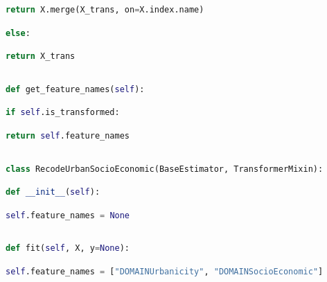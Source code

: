 \documentclass[
  11pt,
  a4paper,
  DIV=12,captions=tableheading,oneside]{scrbook}
\begin{document}
\begin{lstlisting}[language=Python,stepnumber=2,basicstyle=\footnotesize]
            return X.merge(X_trans, on=X.index.name)\end{lstlisting}
\begin{lstlisting}[language=Python,stepnumber=2,basicstyle=\footnotesize]
        else:\end{lstlisting}
\begin{lstlisting}[language=Python,stepnumber=2,basicstyle=\footnotesize]
            return X_trans\end{lstlisting}
\begin{lstlisting}[language=Python,stepnumber=2,basicstyle=\footnotesize]
\end{lstlisting}
\begin{lstlisting}[language=Python,stepnumber=2,basicstyle=\footnotesize]
    def get_feature_names(self):\end{lstlisting}
\begin{lstlisting}[language=Python,stepnumber=2,basicstyle=\footnotesize]
        if self.is_transformed:\end{lstlisting}
\begin{lstlisting}[language=Python,stepnumber=2,basicstyle=\footnotesize]
            return self.feature_names\end{lstlisting}
\begin{lstlisting}[language=Python,stepnumber=2,basicstyle=\footnotesize]
\end{lstlisting}
\begin{lstlisting}[language=Python,stepnumber=2,basicstyle=\footnotesize]
class RecodeUrbanSocioEconomic(BaseEstimator, TransformerMixin):\end{lstlisting}
\begin{lstlisting}[language=Python,stepnumber=2,basicstyle=\footnotesize]
    def __init__(self):\end{lstlisting}
\begin{lstlisting}[language=Python,stepnumber=2,basicstyle=\footnotesize]
        self.feature_names = None\end{lstlisting}
\begin{lstlisting}[language=Python,stepnumber=2,basicstyle=\footnotesize]
\end{lstlisting}
\begin{lstlisting}[language=Python,stepnumber=2,basicstyle=\footnotesize]
    def fit(self, X, y=None):\end{lstlisting}
\begin{lstlisting}[language=Python,stepnumber=2,basicstyle=\footnotesize]
        self.feature_names = ["DOMAINUrbanicity", "DOMAINSocioEconomic"]\end{lstlisting}
\end{document}
